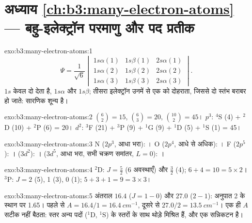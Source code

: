 \section*{अध्याय \ref{ch:b3:many-electron-atoms} --- बहु-इलेक्ट्रॉन परमाणु और पद प्रतीक}

\begin{solution}{exo:b3:many-electron-atoms:1}
\[
\Psi = \frac{1}{\sqrt6}\begin{vmatrix}1s\alpha(1) & 1s\beta(1) & 2s\alpha(1)\\
1s\alpha(2) & 1s\beta(2) & 2s\alpha(2)\\ 1s\alpha(3) & 1s\beta(3) & 2s\alpha(3)
\end{vmatrix}.
\]
$1s$ केवल दो  देता है, $1s\alpha$ और $1s\beta$; तीसरा इलेक्ट्रॉन
उनमें से एक को दोहराता, जिससे दो स्तंभ बराबर हो जाते: सारणिक शून्य है।
\end{solution}

\begin{solution}{exo:b3:many-electron-atoms:2}
$\binom62 = 15$, $\binom63 = 20$, $\binom{10}{2} = 45$। $p^3$: ${}^4$S (4) +
${}^2$D (10) + ${}^2$P (6) = 20। $d^2$: ${}^3$F (21) + ${}^3$P (9) + ${}^1$G (9) +
${}^1$D (5) + ${}^1$S (1) = 45।
\end{solution}

\begin{solution}{exo:b3:many-electron-atoms:3}
N ($2p^3$, आधा भरा): । O ($2p^4$, आधे से अधिक):
। F ($2p^5$): ।  ($3d^2$):
।  ($3d^5$, आधा भरा, सभी चक्रण समांतर, $L = 0$):
।
\end{solution}

\begin{solution}{exo:b3:many-electron-atoms:4}
${}^2$D: $J = \frac52$ (6 अवस्थाएँ) और $\frac32$ (4); $6 + 4 = 10 = 5 \times 2$।
${}^3$P: $J = 2$ (5), 1 (3), 0 (1); $5 + 3 + 1 = 9 = 3 \times 3$।
\end{solution}

\begin{solution}{exo:b3:many-electron-atoms:5}
अंतराल $16.4$ ($J = 1 - 0$) और $27.0$ ($2 - 1$): अनुपात 2 के स्थान पर 1.65।
पहले से $A = 16.4/1 = \qty{16.4}{cm^{-1}}$, दूसरे से $27.0/2 = \qty{13.5}{cm^{-1}}$।
एक ही $A$ सटीक नहीं बैठता: स्तर अन्य पदों (${}^1$D, ${}^1$S) के स्तरों के साथ
थोड़े मिश्रित हैं, और  एक
सन्निकटन है।
\end{solution}


